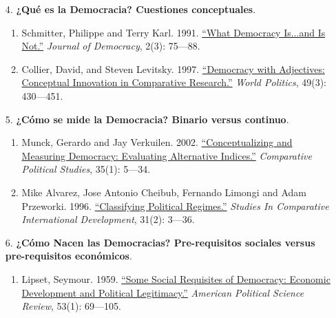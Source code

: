 \documentclass[letterpaper]{article}
\begin{document}
\begin{enumerate}
\begin{enumerate}
				\item[4.] {\bf ¿Qu\'e es la Democracia? Cuestiones conceptuales}.
					\begin{enumerate}
					 \item Schmitter, Philippe and Terry Karl. 1991. \href{https://github.com/hbahamonde/Ciencia_Politica_I/raw/master/Readings/Schmitter_Karl.pdf}{``What Democracy Is...and Is Not.''} \emph{Journal of Democracy}, 2(3): 75---88.
					 
					 \item Collier, David, and Steven Levitsky. 1997. \href{https://github.com/hbahamonde/Ciencia_Politica_I/raw/master/Readings/Collier_Levitsky.pdf}{``Democracy with Adjectives: Conceptual Innovation in Comparative Research.''} \emph{World Politics}, 49(3): 430---451. 
					\end{enumerate}
			
				\item[5.] {\bf ¿C\'omo se mide la Democracia? Binario versus continuo}.
					\begin{enumerate}
						\item Munck, Gerardo and Jay Verkuilen. 2002. \href{https://github.com/hbahamonde/Ciencia_Politica_I/raw/master/Readings/Munck_Verkuilen.pdf}{``Conceptualizing and Measuring Democracy: Evaluating Alternative Indices.''} \emph{Comparative Political Studies}, 35(1): 5---34.%
						
						\item Mike Alvarez, Jose Antonio Cheibub, Fernando Limongi and Adam Przeworki. 1996. \href{https://github.com/hbahamonde/Ciencia_Politica_I/raw/master/Readings/Classifying_Alvarez.pdf}{``Classifying Political Regimes.''} \emph{Studies In Comparative International Development}, 31(2): 3---36. %
					\end{enumerate}
			
				\item[6.] {\bf ¿C\'omo Nacen las Democracias? Pre-requisitos sociales versus pre-requisitos econ\'omicos}.  
					\begin{enumerate}
						\item Lipset, Seymour. 1959. \href{https://github.com/hbahamonde/Ciencia_Politica_I/raw/master/Readings/Lipset.pdf}{``Some Social Requisites of Democracy: Economic Development and Political Legitimacy.''} \emph{American Political Science Review}, 53(1): 69---105.


\end{enumerate}
\end{enumerate}
\end{enumerate}
\end{document}
